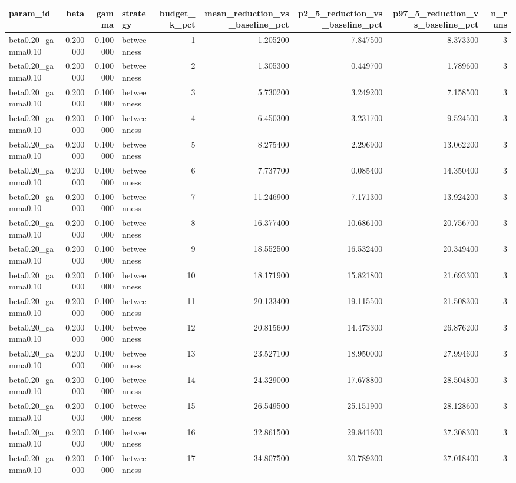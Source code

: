 \begin{tabular}{lrrlrrrrr}
\toprule
param\_id & beta & gamma & strategy & budget\_k\_pct & mean\_reduction\_vs\_baseline\_pct & p2\_5\_reduction\_vs\_baseline\_pct & p97\_5\_reduction\_vs\_baseline\_pct & n\_runs \\
\midrule
beta0.20\_gamma0.10 & 0.200000 & 0.100000 & betweenness & 1 & -1.205200 & -7.847500 & 8.373300 & 3 \\
beta0.20\_gamma0.10 & 0.200000 & 0.100000 & betweenness & 2 & 1.305300 & 0.449700 & 1.789600 & 3 \\
beta0.20\_gamma0.10 & 0.200000 & 0.100000 & betweenness & 3 & 5.730200 & 3.249200 & 7.158500 & 3 \\
beta0.20\_gamma0.10 & 0.200000 & 0.100000 & betweenness & 4 & 6.450300 & 3.231700 & 9.524500 & 3 \\
beta0.20\_gamma0.10 & 0.200000 & 0.100000 & betweenness & 5 & 8.275400 & 2.296900 & 13.062200 & 3 \\
beta0.20\_gamma0.10 & 0.200000 & 0.100000 & betweenness & 6 & 7.737700 & 0.085400 & 14.350400 & 3 \\
beta0.20\_gamma0.10 & 0.200000 & 0.100000 & betweenness & 7 & 11.246900 & 7.171300 & 13.924200 & 3 \\
beta0.20\_gamma0.10 & 0.200000 & 0.100000 & betweenness & 8 & 16.377400 & 10.686100 & 20.756700 & 3 \\
beta0.20\_gamma0.10 & 0.200000 & 0.100000 & betweenness & 9 & 18.552500 & 16.532400 & 20.349400 & 3 \\
beta0.20\_gamma0.10 & 0.200000 & 0.100000 & betweenness & 10 & 18.171900 & 15.821800 & 21.693300 & 3 \\
beta0.20\_gamma0.10 & 0.200000 & 0.100000 & betweenness & 11 & 20.133400 & 19.115500 & 21.508300 & 3 \\
beta0.20\_gamma0.10 & 0.200000 & 0.100000 & betweenness & 12 & 20.815600 & 14.473300 & 26.876200 & 3 \\
beta0.20\_gamma0.10 & 0.200000 & 0.100000 & betweenness & 13 & 23.527100 & 18.950000 & 27.994600 & 3 \\
beta0.20\_gamma0.10 & 0.200000 & 0.100000 & betweenness & 14 & 24.329000 & 17.678800 & 28.504800 & 3 \\
beta0.20\_gamma0.10 & 0.200000 & 0.100000 & betweenness & 15 & 26.549500 & 25.151900 & 28.128600 & 3 \\
beta0.20\_gamma0.10 & 0.200000 & 0.100000 & betweenness & 16 & 32.861500 & 29.841600 & 37.308300 & 3 \\
beta0.20\_gamma0.10 & 0.200000 & 0.100000 & betweenness & 17 & 34.807500 & 30.789300 & 37.018400 & 3 \\

\end{tabular}

